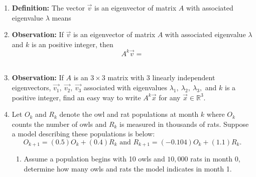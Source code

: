 \documentclass[11pt,fleqn]{article}
\begin{document}
\renewcommand{\headrulewidth}{0pt}
\newcommand{\blank}[1]{\rule{#1}{0.75pt}}
\renewcommand{\d}{\displaystyle}

\newcommand{\bpm}{\begin{pmatrix}}
\newcommand{\epm}{\end{pmatrix}}
\newcommand{\bbm}{\begin{bmatrix}}
\newcommand{\ebm}{\end{bmatrix}}

\vspace*{-0.7in}

\begin{center}
  \large {} \end{center}
 \begin{enumerate}
 \item \textbf{Definition:} The vector $\vec{v}$ is an eigenvector of matrix $A$ with associated eigenvalue $\lambda$ means \\
 
 \vspace{0.5in}
 
 \item \textbf{Observation:} If  $\vec{v}$ is an eigenvector of matrix $A$ with associated eigenvalue $\lambda$ and $k$ is an positive integer, then $$A^k\vec{v}=$$\\
 
 \item \textbf{Observation:} If $A$ is an $3 \times  3$ matrix with $3$ linearly  independent eigenvectors, $\vec{v_1}, \: \vec{v_2},\:\vec{v_3}$ associated with eigenvalues $\lambda_1, \:\lambda_2, \:\lambda_3,$ and $k$ is a positive integer, find an easy way to write $A^k \vec{x}$ for any $\vec{x} \in \mathbb{R}^3.$\\
 
 \vspace{1.5in}

 \item  Let $O_k$ and $R_k$ denote the owl and rat populations at month $k$ where $O_k$ counts the number of owls and $R_k$ is measured in thousands of rats. Suppose a model describing these populations is below: 
 $$O_{k+1}=(0.5)O_{k}+(0.4)R_k \text{   and   } R_{k+1}=(-0.104)O_k+(1.1)R_k.$$
 \begin{enumerate}
 \item Assume a population begins with 10 owls and $10,000$ rats in month 0, determine how many owls and rats the model indicates in month 1.
 

\end{enumerate}
\end{enumerate}
\end{document}
